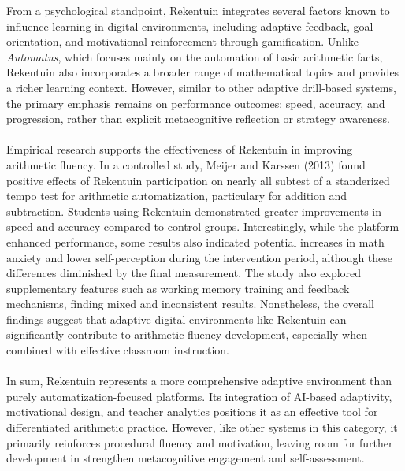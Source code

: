 From a psychological standpoint, Rekentuin integrates several factors known to influence learning in digital environments, including adaptive feedback, goal orientation, and motivational reinforcement through gamification. Unlike \textit{Automatus}, which focuses mainly on the automation of basic arithmetic facts, Rekentuin also incorporates a broader range of mathematical topics and provides a richer learning context. However, similar to other adaptive drill-based systems, the primary emphasis remains on performance outcomes: speed, accuracy, and progression, rather than explicit metacognitive reflection or strategy awareness.\\ \\
Empirical research supports the effectiveness of Rekentuin in improving arithmetic fluency. In a controlled study, Meijer and Karssen (2013) \cite{meijer_effecten_nodate} found positive effects of Rekentuin participation on nearly all subtest of a standerized tempo test for arithmetic automatization, particulary for addition and subtraction. Students using Rekentuin demonstrated greater improvements in speed and accuracy compared to control groups. Interestingly, while the platform enhanced performance, some results also indicated potential increases in math anxiety and lower self-perception during the intervention period, although these differences diminished by the final measurement. The study also explored supplementary features such as working memory training and feedback mechanisms, finding mixed and inconsistent results. Nonetheless, the overall findings suggest that adaptive digital environments like Rekentuin can significantly contribute to arithmetic fluency development, especially when combined with effective classroom instruction. \\ \\
In sum, Rekentuin represents a more comprehensive adaptive environment than purely automatization-focused platforms. Its integration of AI-based adaptivity, motivational design, and teacher analytics positions it as an effective tool for differentiated arithmetic practice. However, like other systems in this category, it primarily reinforces procedural fluency and motivation, leaving room for further development in strengthen metacognitive engagement and self-assessment.

